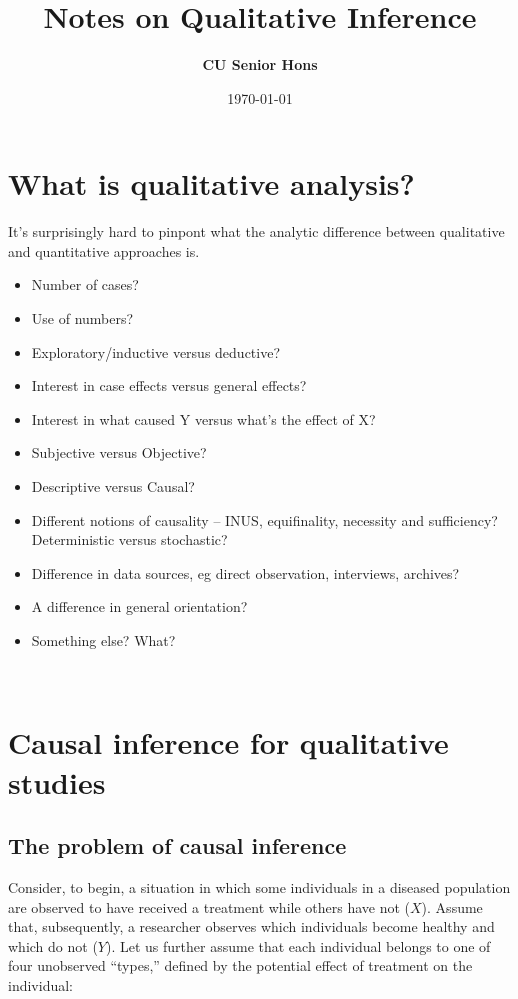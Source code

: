 \documentclass[11pt]{article}
\title{Notes on Qualitative Inference}
\author{{\bf CU Senior Hons}}
\date{\today}
\begin{document}
\color{black}
\singlespacing
\maketitle

\thispagestyle{empty}

\section{What is qualitative analysis?}
It's surprisingly hard to pinpont what the analytic difference between qualitative and quantitative approaches is.
\begin{itemize}
	\item Number of cases?
	\item Use of numbers?
	\item Exploratory/inductive versus deductive?
	\item Interest in case effects versus general effects?
	\item Interest in what caused Y versus what's the effect of X?
	\item Subjective versus Objective?
	\item Descriptive versus Causal?
	\item Different notions of causality -- INUS, equifinality, necessity and sufficiency? Deterministic versus stochastic?
	\item Difference in data sources, eg direct observation, interviews, archives?
	\item A difference in general orientation? 	
	\item Something else? What?
\end{itemize}

 \newpage
\section{Causal inference for qualitative studies}

\subsection{The problem of causal inference}

Consider, to begin, a situation in which some individuals in a diseased population are observed to have received a treatment while others have not ($X$). Assume that, subsequently, a researcher observes which individuals become healthy and which do not ($Y$). Let us further assume that each individual belongs to one of four unobserved ``types,'' defined by the potential effect of treatment on the individual:
\end{document}
